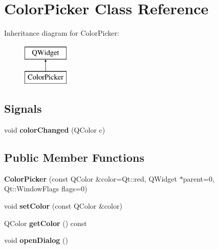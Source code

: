 \hypertarget{class_color_picker}{\section{Color\-Picker Class Reference}
\label{class_color_picker}
}
Inheritance diagram for Color\-Picker\-:\begin{figure}[H]
\begin{center}
\leavevmode
\includegraphics[height=2.000000cm]{class_color_picker}
\end{center}
\end{figure}
\subsection*{Signals}
\begin{DoxyCompactItemize}
\item 
\hypertarget{class_color_picker_abb4463b286fe96a43497d572872e9efb}{void {\bfseries color\-Changed} (Q\-Color c)}\label{class_color_picker_abb4463b286fe96a43497d572872e9efb}

\end{DoxyCompactItemize}
\subsection*{Public Member Functions}
\begin{DoxyCompactItemize}
\item 
\hypertarget{class_color_picker_a27ce1e2f46f9974495b29fb5fbddafc5}{{\bfseries Color\-Picker} (const Q\-Color \&color=Qt\-::red, Q\-Widget $\ast$parent=0, Qt\-::\-Window\-Flags flags=0)}\label{class_color_picker_a27ce1e2f46f9974495b29fb5fbddafc5}

\item 
\hypertarget{class_color_picker_acfbfb9c677193c4dbf86c7a87604c88f}{void {\bfseries set\-Color} (const Q\-Color \&color)}\label{class_color_picker_acfbfb9c677193c4dbf86c7a87604c88f}

\item 
\hypertarget{class_color_picker_ac124676093123d4682721fc8df80198a}{Q\-Color {\bfseries get\-Color} () const }\label{class_color_picker_ac124676093123d4682721fc8df80198a}

\item 
\hypertarget{class_color_picker_af50a96174353489c2bc2c987b74683ee}{void {\bfseries open\-Dialog} ()}\label{class_color_picker_af50a96174353489c2bc2c987b74683ee}

\end{DoxyCompactItemize}
